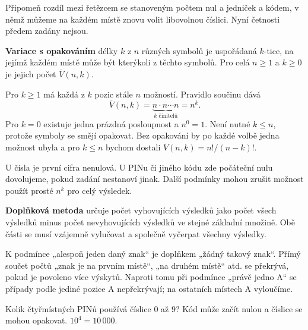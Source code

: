 \documentclass[11pt,a4paper]{article}
\begin{document}
Připomeň rozdíl mezi řetězcem se stanoveným počtem nul a jedniček a kódem, v němž můžeme na každém místě znovu volit libovolnou číslici. Nyní četnosti předem zadány nejsou.

\begin{definiceBox}
\textbf{Variace s opakováním} délky $k$ z $n$ různých symbolů je uspořádaná $k$-tice, na jejímž každém místě může být kterýkoli z těchto symbolů. Pro celá $n\geq1$ a $k\geq0$ je jejich počet $\overline V(n,k)$.
\end{definiceBox}

Pro $k\geq1$ má každá z $k$ pozic stále $n$ možností. Pravidlo součinu dává
\[
 \overline V(n,k)=\underbrace{n\cdot n\cdots n}_{k\text{ činitelů}}=n^k.
\]
Pro $k=0$ existuje jedna prázdná posloupnost a $n^0=1$. Není nutné $k\leq n$, protože symboly se smějí opakovat. Bez opakování by po každé volbě jedna možnost ubyla a pro $k\leq n$ bychom dostali $V(n,k)=n!/(n-k)!$.

U čísla je první cifra nenulová. U PINu či jiného kódu zde počáteční nulu dovolujeme, pokud zadání nestanoví jinak. Další podmínky mohou zrušit možnost použít prosté $n^k$ pro celý výsledek.\begin{definiceBox}
\textbf{Doplňková metoda} určuje počet vyhovujících výsledků jako počet všech výsledků minus počet nevyhovujících výsledků ve stejné základní množině. Obě části se musí vzájemně vylučovat a společně vyčerpat všechny výsledky.
\end{definiceBox}

K podmínce „alespoň jeden daný znak“ je doplňkem „žádný takový znak“. Přímý součet počtů „znak je na prvním místě“, „na druhém místě“ atd. se překrývá, pokud je povoleno více výskytů. Naproti tomu při podmínce „právě jedno A“ se případy podle jediné pozice A nepřekrývají; na ostatních místech A vyloučíme.




\begin{prikladReseniBox}[title={Příklad P1}]
Kolik čtyřmístných PINů používá číslice \(0\) až \(9\)?
\tcblower
Kód může začít nulou a číslice se mohou opakovat. \(10^4=10\,000\).
\end{prikladReseniBox}
\end{document}
